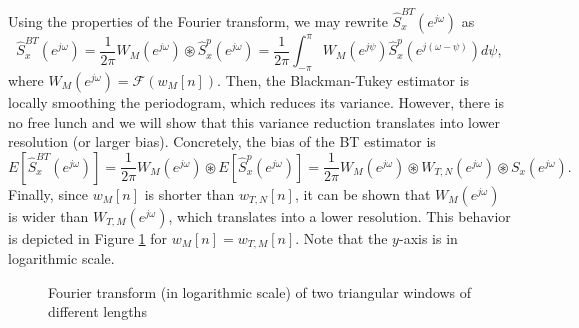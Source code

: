 Using the properties of the Fourier transform, we may rewrite $\hat{S}_x^{BT}(e^{j \omega})$ as
\begin{equation*}
\hat{S}_x^{BT}(e^{j \omega}) = \frac{1}{2 \pi} W_M(e^{j \omega}) \circledast \hat{S}_x^{p}(e^{j \omega}) = \frac{1}{2 \pi} \int_{-\pi}^{\pi} W_{M}(e^{j \psi}) \hat{S}_x^{p}(e^{j (\omega - \psi)}) d \psi,
\end{equation*} 
where $W_M(e^{j \omega}) = \mathcal{F}(w_M[n])$. Then, the Blackman-Tukey estimator is locally smoothing the periodogram, which reduces its variance. However, there is no free lunch and we will show that this variance reduction translates into lower resolution (or larger bias). Concretely, the bias of the BT estimator is
\begin{equation*}
E\left[\hat{S}_x^{BT}(e^{j \omega})\right] = \frac{1}{2 \pi} W_M(e^{j \omega}) \circledast E\left[\hat{S}_x^{p}(e^{j \omega})\right] = \frac{1}{2 \pi} W_M(e^{j \omega}) \circledast  W_{T,N}(e^{j \omega}) \circledast S_x(e^{j \omega}).
\end{equation*}
Finally, since $w_M[n]$ is shorter than $w_{T,N}[n]$, it can be shown that $W_M(e^{j \omega})$ is wider than $W_{T,M}(e^{j \omega})$, which translates into a lower resolution. This behavior is depicted in Figure \ref{fig:comparison_windows} for $w_M[n] = w_{T,M}[n]$. Note that the $y$-axis is in logarithmic scale.
\begin{figure}
	\begin{center}
	\end{center}
	\caption{Fourier transform (in logarithmic scale) of two triangular windows of different lengths}
	\label{fig:comparison_windows}
\end{figure}



